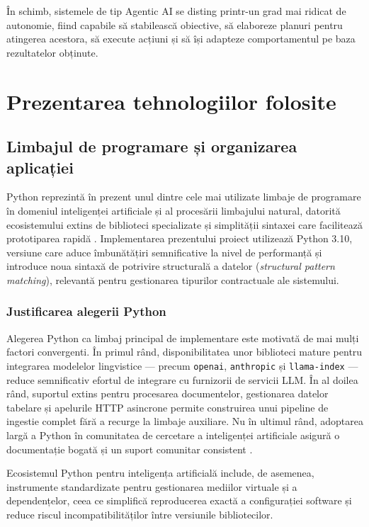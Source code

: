 \documentclass[12pt, a4paper, oneside, romanian]{teza-upb}
\begin{document}
În schimb, sistemele de tip Agentic AI se disting printr-un grad mai ridicat de autonomie, fiind capabile să stabilească obiective, să elaboreze planuri pentru atingerea acestora, să execute acțiuni și să își adapteze comportamentul pe baza rezultatelor obținute. \cite{agentic_medium}



\cleardoublepage
\chapter{Prezentarea tehnologiilor folosite}

\section{Limbajul de programare și organizarea aplicației}

Python reprezintă în prezent unul dintre cele mai utilizate limbaje de programare în domeniul inteligenței artificiale și al procesării limbajului natural, datorită ecosistemului extins de biblioteci specializate și simplității sintaxei care facilitează prototiparea rapidă \cite{python310}. Implementarea prezentului proiect utilizează Python 3.10, versiune care aduce îmbunătățiri semnificative la nivel de performanță și introduce noua sintaxă de potrivire structurală a datelor (\textit{structural pattern matching}), relevantă pentru gestionarea tipurilor contractuale ale sistemului.

\subsection{Justificarea alegerii Python}

Alegerea Python ca limbaj principal de implementare este motivată de mai mulți factori convergenti. În primul rând, disponibilitatea unor biblioteci mature pentru integrarea modelelor lingvistice — precum \texttt{openai}, \texttt{anthropic} și \texttt{llama-index} — reduce semnificativ efortul de integrare cu furnizorii de servicii LLM. În al doilea rând, suportul extins pentru procesarea documentelor, gestionarea datelor tabelare și apelurile HTTP asincrone permite construirea unui pipeline de ingestie complet fără a recurge la limbaje auxiliare. Nu în ultimul rând, adoptarea largă a Python în comunitatea de cercetare a inteligenței artificiale asigură o documentație bogată și un suport comunitar consistent \cite{goodfellow2016}.

Ecosistemul Python pentru inteligența artificială include, de asemenea, instrumente standardizate pentru gestionarea mediilor virtuale și a dependențelor, ceea ce simplifică reproducerea exactă a configurației software și reduce riscul incompatibilităților între versiunile bibliotecilor.
\end{document}
